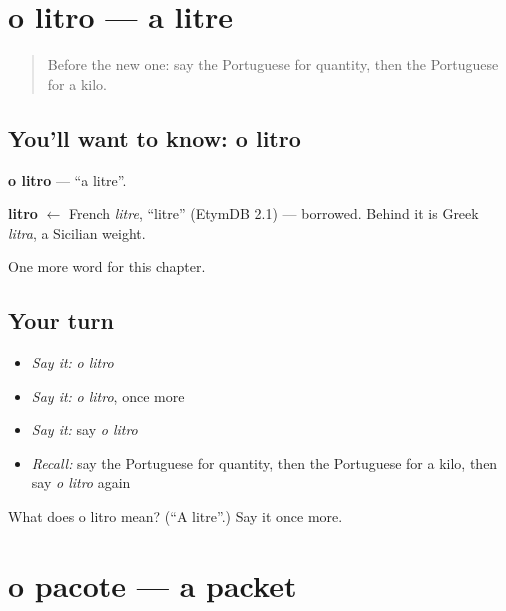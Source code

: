 \section[o litro]{o litro — a litre}

\label{lesson:PT-C198-litro}



\begin{quote}
Before the new one: say the Portuguese for quantity, then the Portuguese for a kilo.
\end{quote}

\subsection*{You'll want to know: o litro}
\textbf{o litro} — \textquotedblleft{}a litre\textquotedblright{}.

\begin{cousinweb}
\textbf{litro} $\leftarrow$ French \emph{litre}, \textquotedblleft{}litre\textquotedblright{} (EtymDB 2.1) — borrowed. Behind it is Greek \emph{litra}, a Sicilian weight.
\end{cousinweb}

\begin{grammarlens}[title={What you've built}]
One more word for this chapter.
\end{grammarlens}

\subsection*{Your turn}
\begin{itemize}
\raggedright
  \item \emph{Say it:} \emph{o litro}
  \item \emph{Say it:} \emph{o litro}, once more
  \item \emph{Say it:} say \emph{o litro}
  \item \emph{Recall:} say the Portuguese for quantity, then the Portuguese for a kilo, then say \emph{o litro} again
\end{itemize}

\begin{tcolorbox}[breakable,colback=teal!4,colframe=teal!35!black,title={Before you move on}]
What does o litro mean? (\textquotedblleft{}A litre\textquotedblright{}.) Say it once more.
\end{tcolorbox}
\section[o pacote]{o pacote — a packet}

